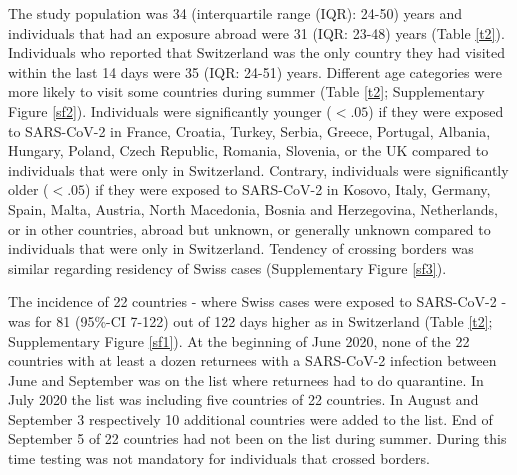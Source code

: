 \documentclass[10pt, a4paper, twoside]{article}
\begin{document}
\begin{multicols}{2}

The study population was 34 (interquartile range (IQR): 24-50) years and individuals that had an exposure abroad were 31 (IQR: 23-48) years (Table \ref{t2}).
Individuals who reported that Switzerland was the only country they had visited within the last 14 days were 35 (IQR: 24-51) years.
Different age categories were more likely to visit some countries during summer (Table \ref{t2}; Supplementary Figure \ref{sf2}).
Individuals were significantly younger ($<.05$) if they were exposed to SARS-CoV-2 in France, Croatia, Turkey, Serbia, Greece, Portugal, Albania, Hungary, Poland, Czech Republic, Romania, Slovenia, or the UK compared to individuals that were only in Switzerland.%
Contrary, individuals were significantly older ($<.05$) if they were exposed to SARS-CoV-2 in Kosovo, Italy, Germany, Spain, Malta, Austria, North Macedonia, Bosnia and Herzegovina, Netherlands, or in other countries, abroad but unknown, or generally unknown compared to individuals that were only in Switzerland.
Tendency of crossing borders was similar regarding residency of Swiss cases (Supplementary Figure \ref{sf3}).

The incidence of 22 countries - where Swiss cases were exposed to SARS-CoV-2 - was for 81 (95\%-CI 7-122) out of 122 days higher as in Switzerland (Table \ref{t2}; Supplementary Figure \ref{sf1}).
At the beginning of June 2020, none of the 22 countries with at least a dozen returnees with a SARS-CoV-2 infection between June and September was on the list where returnees had to do quarantine.
In July 2020 the list was including five countries of 22 countries.
In August and September 3 respectively 10 additional countries were added to the list.
End of September 5 of 22 countries had not been on the list during summer.
During this time testing was not mandatory for individuals that crossed borders.



\end{multicols}
\end{document}
